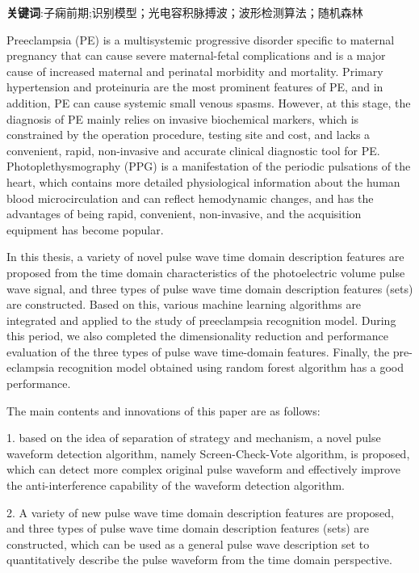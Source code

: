 \textbf{关键词}:子痫前期;识别模型；光电容积脉搏波；波形检测算法；随机森林



\cleardoublepage
{}

Preeclampsia (PE) is a multisystemic progressive disorder specific to maternal pregnancy that can cause severe maternal-fetal complications and is a major cause of increased maternal and perinatal morbidity and mortality. Primary hypertension and proteinuria are the most prominent features of PE, and in addition, PE can
cause systemic small venous spasms. However, at this stage, the diagnosis of PE mainly relies on invasive biochemical markers, which is constrained by the operation procedure, testing site and cost, and lacks a convenient, rapid, non-invasive and accurate clinical diagnostic tool for PE.
Photoplethysmography (PPG) is a manifestation of the periodic pulsations of the heart, which contains more detailed physiological information about the human blood microcirculation and can reflect hemodynamic changes, and has the advantages of being rapid, convenient, non-invasive, and the acquisition equipment has become popular.

In this thesis, a variety of novel pulse wave time domain description features are proposed from the time domain characteristics of the photoelectric volume pulse wave signal, and three types of pulse wave time domain description features (sets) are constructed. Based on this, various machine learning algorithms are integrated and applied to the study of preeclampsia recognition model.
During this period, we also completed the dimensionality reduction and performance evaluation of the three types of pulse wave time-domain features. Finally, the pre-eclampsia recognition model obtained using random forest algorithm has a good performance.

The main contents and innovations of this paper are as follows:

1. based on the idea of separation of strategy and mechanism, a novel pulse waveform detection algorithm, namely Screen-Check-Vote algorithm, is proposed, which can detect more complex original pulse waveform and effectively improve the anti-interference capability of the waveform detection algorithm.

2. A variety of new pulse wave time domain description features are proposed, and three types of pulse wave time domain description features (sets) are constructed, which can be used as a general pulse wave description set to quantitatively describe the pulse waveform from the time domain perspective.

